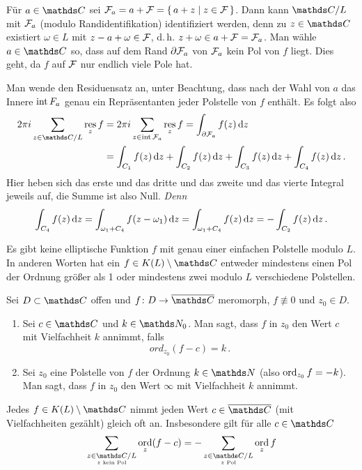 \begin{bewe}
Für $a\in\CC$ sei $\mathcal{F}_a = a + \mathcal{F} = \left\{\,a + z \mid z\in\mathcal{F}\,\right\}$.
Dann kann $\CC/L$ mit $\mathcal{F}_a$ (modulo Randidentifikation) identifiziert werden, denn zu $z\in\CC$ existiert $\omega \in L$ mit $z-a+\omega \in \mathcal{F}$, d.\,h. $z+\omega \in a + \mathcal{F} = \mathcal{F}_a$.
Man wähle $a\in\CC$ so, dass auf dem Rand $\partial \mathcal{F}_a$ von $\mathcal{F}_a$ kein Pol von $f$ liegt.
Dies geht, da $f$ auf $\mathcal{F}$ nur endlich viele Pole hat.

Man wende den Residuensatz an, unter Beachtung, dass nach der Wahl von $a$ das Innere $\operatorname{int} F_a$ genau ein Repräsentanten jeder Polstelle von $f$ enthält.
Es folgt also
\begin{align*}
	2\pi i \sum_{z\in\CC/L} \res_z f
	&= 2\pi i \sum_{z\in \innere \F_a} \res_z f
	= \int_{\partial \F_a} f(z)\opd z \\
	&= \int_{C_1} f(z) \opd z + \int_{C_2} f(z) \opd z + \int_{C_3} f(z) \opd z + \int_{C_4} f(z) \opd z
	\,.
\end{align*}
Hier heben sich das erste und das dritte und das zweite und das vierte Integral jeweils auf, die Summe ist also Null.
\emph{Denn}
\[
	\int_{C_4} f(z)\,\mathrm{d} z
	= \int_{\omega_1 + C_4} f(z-\omega_1) \,\mathrm{d} z
	= \int_{\omega_1 + C_4} f(z)\,\mathrm{d} z
	= -\int_{C_2} f(z) \,\mathrm{d} z
	\,.
\]
\end{bewe}

\begin{koro}
Es gibt keine elliptische Funktion $f$ mit genau einer einfachen Polstelle modulo $L$.
In anderen Worten hat ein $f\in K(L)\setminus\CC$ entweder mindestens einen Pol der Ordnung größer als 1 oder mindestens zwei modulo $L$ verschiedene Polstellen.
\end{koro}

\begin{defi-noind}
Sei $D \subset \CC$ offen und $f\colon D \ra \closure \CC$ meromorph, $f \not\equiv 0$ und $z_0 \in D$.
\begin{enumerate}
\item Sei $c\in \CC$ und $k\in\NN_0$.
Man sagt, dass $f$ in $z_0$ den Wert $c$ mit Vielfachheit $k$ annimmt, falls
\[
	ord_{z_0} (f-c) = k
	\,.
\]

\item Sei $z_0$ eine Polstelle von $f$ der Ordnung $k\in\NN$ (also $\operatorname*{ord}_{z_0} f = -k$).
Man sagt, dass $f$ in $z_0$ den Wert $\infty$ mit Vielfachheit $k$ annimmt.
\end{enumerate}
\end{defi-noind}

\begin{satz}\label{satz:liouville-3}
Jedes $f \in K(L)\setminus\CC$ nimmt jeden Wert $c\in\closure\CC$ (mit Vielfachheiten gezählt) gleich oft an.
Insbesondere gilt für alle $c\in\CC$
\[
	\sum_{\substack{z\in\CC/L\\ \scriptscriptstyle z \text{ kein Pol}}} \ord_z(f-c)
	= -\sum_{\substack{z\in\CC/L\\ \scriptscriptstyle z \text{ Pol}}} \ord_z f
\]
\end{satz}

